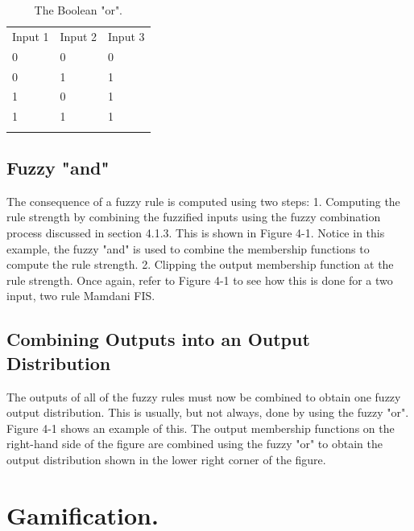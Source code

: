 \begin{table}
\small
\caption{The Boolean "or".}
\label{tab:boolean_or} 
\centering
\small
\begin{tabular}{p{3cm} p{3cm} p{3cm} }
\hline\noalign{\smallskip}
 Input 1 & Input 2 & Input 3 \\
\noalign{\smallskip}\hline\noalign{\smallskip}
\small{0} & \small{0} & \small{0}\\ \hline  
\small{0} & \small{1} & \small{1}\\ \hline  
\small{1} & \small{0} & \small{1}\\ \hline  
\small{1} & \small{1} & \small{1}\\ \hline  
\noalign{\smallskip}\hline
\end{tabular}
\end{table}

\subsection{Fuzzy "and"}

The consequence of a fuzzy rule is computed using two steps: 1. Computing the
rule strength by combining the fuzzified inputs using the fuzzy combination
process discussed in section 4.1.3. This is shown in Figure 4-1. Notice in this
example, the fuzzy "and" is used to combine the membership functions to compute
the rule strength. 2. Clipping the output membership function at the rule
strength. Once again, refer to Figure 4-1 to see how this is done for a two
input, two rule Mamdani FIS.

\subsection{Combining Outputs into an Output Distribution} The outputs of all of
the fuzzy rules must now be combined to obtain one fuzzy output distribution.
This is usually, but not always, done by using the fuzzy "or". Figure 4-1 shows
an example of this. The output membership functions on the right-hand side of
the figure are combined using the fuzzy "or" to obtain the output distribution
shown in the lower right corner of the figure.






\section{Gamification.}


